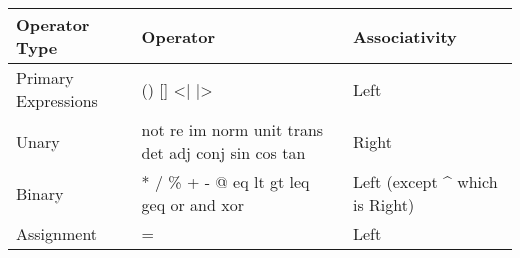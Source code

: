 \begin{flushleft}
\begin{tabular}{|l|l|l|}
	\hline    
	                   
	Operator Type & 
	Operator & 
	Associativity\\
	
	\hline
	Primary Expressions &
	() [] <| |> &
	Left\\
	Unary & 
	not re im norm unit trans det adj conj sin cos tan & 
	Right\\
	Binary & 
	* / \% + - @ eq lt gt leq geq or and xor &
	Left (except \string^ which is Right)\\
	Assignment &
	= 
	& Left\\
	
	\hline  
\end{tabular}
\end{flushleft}